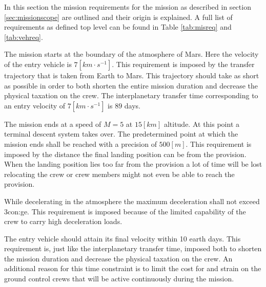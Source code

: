 In this section the mission requirements for the mission as described in section \ref{sec:missionscope} are outlined and their origin is explained. A full list of requirements as defined top level can be found in Table \ref{tab:misreq} and \ref{tab:vehreq}.

The mission starts at the boundary of the atmosphere of Mars. Here the velocity of the entry vehicle is $7 \left[km \cdot s^{-1} \right]$. This requirement is imposed by the transfer trajectory that is taken from Earth to Mars. This trajectory should take as short as possible in order to both shorten the entire mission duration and decrease the physical taxation on the crew. The interplanetary transfer time corresponding to an entry velocity of $7 \left[km \cdot s^{-1} \right]$ is $89$ days. 

The mission ends at a speed of $M=5$ at $15 \left[km\right]$ altitude. At this point a terminal descent system takes over. The predetermined point at which the mission ends shall be reached with a precision of $500 \left[m\right]$. This requirement is imposed by the distance the final landing position can be from the provision. When the landing position lies too far from the provision a lot of time will be lost relocating the crew or crew members might not even be able to reach the provision.

While decelerating in the atmosphere the maximum deceleration shall not exceed 3\gls{con:ge}. This requirement is imposed because of the limited capability of the crew to carry high deceleration loads.

The entry vehicle should attain its final velocity within 10 earth days. This requirement is, just like the interplanetary transfer time, imposed both to shorten the mission duration and decrease the physical taxation on the crew. An additional reason for this time constraint is to limit the cost for and strain on the ground control crews that will be active continuously during the mission.


